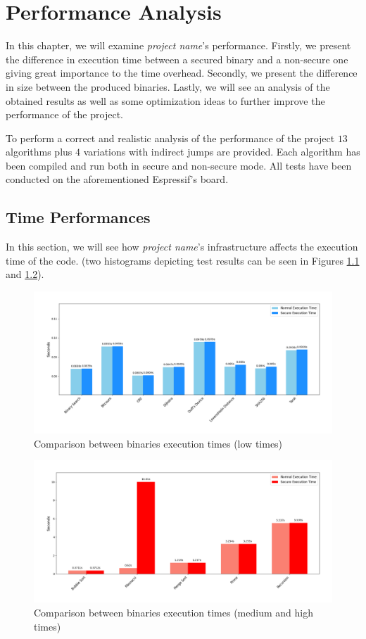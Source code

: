\chapter{Performance Analysis}
\label{cha:pa}

In this chapter, we will examine \textit{project name}'s performance. Firstly,
we present the difference in execution time between a secured binary and a non-secure
one giving great importance to the time overhead. Secondly, we present the
difference in size between the produced binaries. Lastly, we will see an
analysis of the obtained results as well as some optimization ideas to further
improve the performance of the project.

To perform a correct and realistic analysis of the performance of the project
$13$ algorithms plus $4$ variations with indirect jumps are provided. Each algorithm
has been compiled and run both in secure and non-secure mode. All tests have
been conducted on the aforementioned Espressif's board.

\section{Time Performances}
\label{sec:pa_time}

In this section, we will see how \textit{project name}'s infrastructure affects the
execution time of the code. (two histograms depicting test results can be seen in
Figures \ref{fig:lowtime} and \ref{fig:hightime}).

\begin{figure}[htbp]
  \centering
  \includegraphics[width=.9\linewidth]{images/low_execution.png}
  \caption{Comparison between binaries execution times (low times)}
  \label{fig:lowtime}
\end{figure}

\begin{figure}[htbp]
  \centering
  \includegraphics[width=.9\linewidth]{images/high_execution.png}
  \caption{Comparison between binaries execution times (medium and high times)}
  \label{fig:hightime}
\end{figure}

